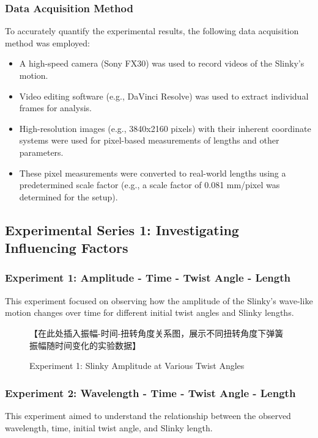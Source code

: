 \documentclass{mcmthesis}  %
\begin{document}
\subsubsection{Data Acquisition Method}
To accurately quantify the experimental results, the following data acquisition method was employed:
\begin{itemize}
    \item A high-speed camera (Sony FX30) was used to record videos of the Slinky's motion.
    \item Video editing software (e.g., DaVinci Resolve) was used to extract individual frames for analysis.
    \item High-resolution images (e.g., 3840x2160 pixels) with their inherent coordinate systems were used for pixel-based measurements of lengths and other parameters.
    \item These pixel measurements were converted to real-world lengths using a predetermined scale factor (e.g., a scale factor of 0.081 mm/pixel was determined for the setup).
\end{itemize}

\subsection{Experimental Series 1: Investigating Influencing Factors}

\subsubsection{Experiment 1: Amplitude - Time - Twist Angle - Length}
This experiment focused on observing how the amplitude of the Slinky's wave-like motion changes over time for different initial twist angles and Slinky lengths.

\begin{figure}[h!]
    \centering
    【在此处插入振幅-时间-扭转角度关系图，展示不同扭转角度下弹簧振幅随时间变化的实验数据】
    \caption{Experiment 1: Slinky Amplitude at Various Twist Angles}
    \label{fig:exp1_amplitude_twists}
\end{figure}

\subsubsection{Experiment 2: Wavelength - Time - Twist Angle - Length}
This experiment aimed to understand the relationship between the observed wavelength, time, initial twist angle, and Slinky length.
\end{document}
